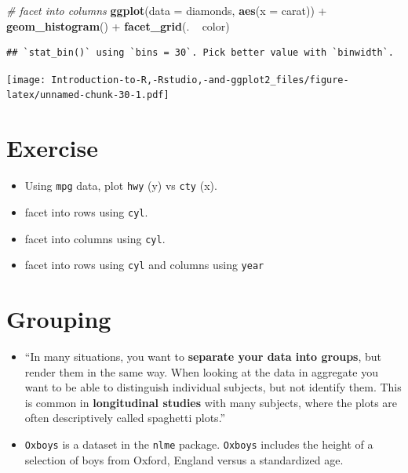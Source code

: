 \documentclass[]{book}
\newenvironment{Shaded}{\begin{snugshade}}{\end{snugshade}}
\newcommand{\KeywordTok}[1]{\textcolor[rgb]{0.13,0.29,0.53}{\textbf{{#1}}}}
\newcommand{\DataTypeTok}[1]{\textcolor[rgb]{0.13,0.29,0.53}{{#1}}}
\newcommand{\StringTok}[1]{\textcolor[rgb]{0.31,0.60,0.02}{{#1}}}
\newcommand{\CommentTok}[1]{\textcolor[rgb]{0.56,0.35,0.01}{\textit{{#1}}}}
\newcommand{\NormalTok}[1]{{#1}}
\begin{document}
\begin{Shaded}
\begin{Highlighting}[]
\CommentTok{# facet into columns}
\KeywordTok{ggplot}\NormalTok{(}\DataTypeTok{data =} \NormalTok{diamonds, }\KeywordTok{aes}\NormalTok{(}\DataTypeTok{x =} \NormalTok{carat)) +}\StringTok{ }\KeywordTok{geom_histogram}\NormalTok{() +}\StringTok{ }\KeywordTok{facet_grid}\NormalTok{(. ~}\StringTok{ }\NormalTok{color)}
\end{Highlighting}
\end{Shaded}

\begin{verbatim}
## `stat_bin()` using `bins = 30`. Pick better value with `binwidth`.
\end{verbatim}

\texttt{[image: Introduction-to-R,-Rstudio,-and-ggplot2\_files/figure-latex/unnamed-chunk-30-1.pdf]}

\section{Exercise}\label{exercise-2}

\begin{itemize}
\item
  Using \texttt{mpg} data, plot \texttt{hwy} (y) vs \texttt{cty} (x).
\item
  facet into rows using \texttt{cyl}.
\item
  facet into columns using \texttt{cyl}.
\item
  facet into rows using \texttt{cyl} and columns using \texttt{year}
\end{itemize}

\section{Grouping}\label{grouping}

\begin{itemize}
\item
  ``In many situations, you want to \textbf{separate your data into
  groups}, but render them in the same way. When looking at the data in
  aggregate you want to be able to distinguish individual subjects, but
  not identify them. This is common in \textbf{longitudinal studies}
  with many subjects, where the plots are often descriptively called
  spaghetti plots.'' \citep{ggplot2}
\item
  \texttt{Oxboys} is a dataset in the \texttt{nlme} package.
  \texttt{Oxboys} includes the height of a selection of boys from
  Oxford, England versus a standardized age.
\end{itemize}
\end{document}
